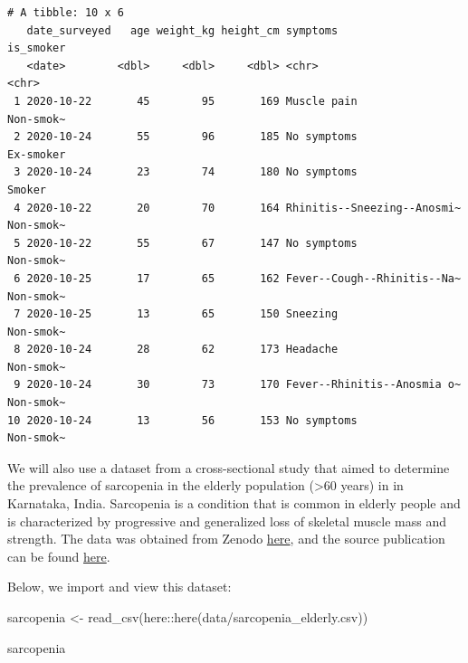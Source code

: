 \documentclass[
  letterpaper,
  DIV=11,
  numbers=noendperiod]{scrreprt}
\newenvironment{Shaded}{\begin{snugshade}}{\end{snugshade}}
\newcommand{\FunctionTok}[1]{\textcolor[rgb]{0.28,0.35,0.67}{#1}}
\newcommand{\NormalTok}[1]{\textcolor[rgb]{0.00,0.23,0.31}{#1}}
\newcommand{\OtherTok}[1]{\textcolor[rgb]{0.00,0.23,0.31}{#1}}
\newcommand{\SpecialCharTok}[1]{\textcolor[rgb]{0.37,0.37,0.37}{#1}}
\newcommand{\StringTok}[1]{\textcolor[rgb]{0.13,0.47,0.30}{#1}}
\begin{document}
\begin{verbatim}
# A tibble: 10 x 6
   date_surveyed   age weight_kg height_cm symptoms                    is_smoker
   <date>        <dbl>     <dbl>     <dbl> <chr>                       <chr>    
 1 2020-10-22       45        95       169 Muscle pain                 Non-smok~
 2 2020-10-24       55        96       185 No symptoms                 Ex-smoker
 3 2020-10-24       23        74       180 No symptoms                 Smoker   
 4 2020-10-22       20        70       164 Rhinitis--Sneezing--Anosmi~ Non-smok~
 5 2020-10-22       55        67       147 No symptoms                 Non-smok~
 6 2020-10-25       17        65       162 Fever--Cough--Rhinitis--Na~ Non-smok~
 7 2020-10-25       13        65       150 Sneezing                    Non-smok~
 8 2020-10-24       28        62       173 Headache                    Non-smok~
 9 2020-10-24       30        73       170 Fever--Rhinitis--Anosmia o~ Non-smok~
10 2020-10-24       13        56       153 No symptoms                 Non-smok~
\end{verbatim}

We will also use a dataset from a cross-sectional study that aimed to
determine the prevalence of sarcopenia in the elderly population
(\textgreater60 years) in in Karnataka, India. Sarcopenia is a condition
that is common in elderly people and is characterized by progressive and
generalized loss of skeletal muscle mass and strength. The data was
obtained from Zenodo \href{https://zenodo.org/record/3691939}{here}, and
the source publication can be found
\href{https://doi.org/10.12688/f1000research.22580.1}{here}.

Below, we import and view this dataset:

\begin{Shaded}
\begin{Highlighting}[]
\NormalTok{sarcopenia }\OtherTok{\textless{}{-}} \FunctionTok{read\_csv}\NormalTok{(here}\SpecialCharTok{::}\FunctionTok{here}\NormalTok{(}\StringTok{\textquotesingle{}data/sarcopenia\_elderly.csv\textquotesingle{}}\NormalTok{))}

\NormalTok{sarcopenia}
\end{Highlighting}
\end{Shaded}
\end{document}

